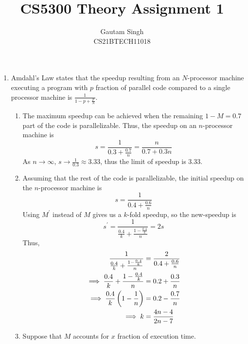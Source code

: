 \documentclass[conference,compsoc]{IEEEtran}
\begin{document}
\vspace{3cm}
\title{CS5300 Theory Assignment 1}
\author{Gautam Singh\\CS21BTECH11018}
\maketitle

\bigskip

\begin{enumerate}
    \item Amdahl's Law states that the speedup resulting from an \(N\)-processor
    machine executing a program with \(p\) fraction of parallel code compared to
    a single processor machine is \(\frac{1}{1 - p + \frac{p}{N}}\).
    \begin{enumerate}
        \item The maximum speedup can be achieved when the remaining \(1 - M =
        0.7\) part of the code is parallelizable. Thus, the speedup on an
        \(n\)-processor machine is
        \begin{equation}
            s = \frac{1}{0.3 + \frac{0.7}{n}} = \frac{n}{0.7 + 0.3n}
        \end{equation}
        As \(n \to \infty\), \(s \to \frac{1}{0.3} \approx 3.33\), thus the
        limit of speedup is 3.33.
        \item Assuming that the rest of the code is parallelizable, the initial
        speedup on the \(n\)-processor machine is
        \begin{equation}
            s = \frac{1}{0.4 + \frac{0.6}{n}}
        \end{equation}
        Using \(M^\prime\) instead of \(M\) gives us a \(k\)-fold speedup, so
        the new-speedup is
        \begin{equation}
            s^\prime = \frac{1}{\frac{0.4}{k} + \frac{1 - \frac{0.4}{k}}{n}} = 2s
        \end{equation}
        Thus,
        \begin{align}
            \frac{1}{\frac{0.4}{k} + \frac{1 - \frac{0.4}{k}}{n}} &= \frac{2}{0.4 + \frac{0.6}{n}} \\
            \implies \frac{0.4}{k} + \frac{1 - \frac{0.4}{k}}{n} &= 0.2 + \frac{0.3}{n} \\
            \implies \frac{0.4}{k}\left(1 - \frac{1}{n}\right) &= 0.2 - \frac{0.7}{n} \\
            \implies k &= \frac{4n - 4}{2n - 7}
        \end{align}
        \item Suppose that \(M\) accounts for \(x\) fraction of execution time.

\end{enumerate}
\end{enumerate}
\end{document}
